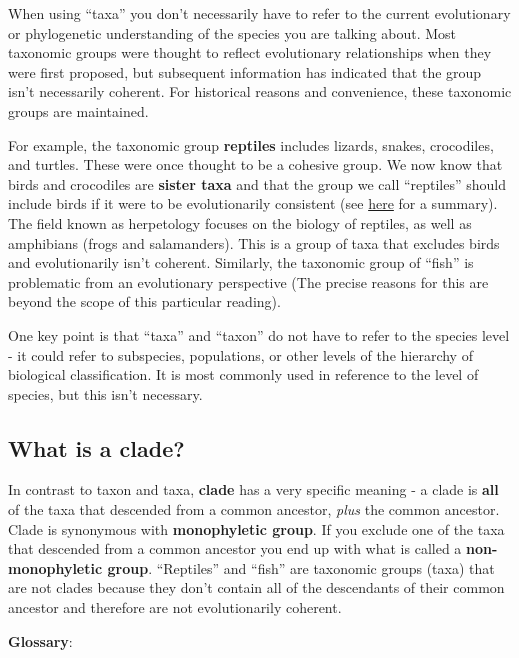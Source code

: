 \documentclass[
]{book}
\begin{document}
When using ``taxa'' you don't necessarily have to refer to the current evolutionary or phylogenetic understanding of the species you are talking about. Most taxonomic groups were thought to reflect evolutionary relationships when they were first proposed, but subsequent information has indicated that the group isn't necessarily coherent. For historical reasons and convenience, these taxonomic groups are maintained.

For example, the taxonomic group \textbf{reptiles} includes lizards, snakes, crocodiles, and turtles. These were once thought to be a cohesive group. We now know that birds and crocodiles are \textbf{sister taxa} and that the group we call ``reptiles'' should include birds if it were to be evolutionarily consistent (see \href{https://en.wikipedia.org/wiki/Reptile\#Phylogenetics_and_modern_definition}{here} for a summary). The field known as herpetology focuses on the biology of reptiles, as well as amphibians (frogs and salamanders). This is a group of taxa that excludes birds and evolutionarily isn't coherent. Similarly, the taxonomic group of ``fish'' is problematic from an evolutionary perspective (The precise reasons for this are beyond the scope of this particular reading).

One key point is that ``taxa'' and ``taxon'' do not have to refer to the species level - it could refer to subspecies, populations, or other levels of the hierarchy of biological classification. It is most commonly used in reference to the level of species, but this isn't necessary.

\hypertarget{what-is-a-clade}{%
\subsection{What is a clade?}\label{what-is-a-clade}}

In contrast to taxon and taxa, \textbf{clade} has a very specific meaning - a clade is \textbf{all} of the taxa that descended from a common ancestor, \emph{plus} the common ancestor. Clade is synonymous with \textbf{monophyletic group}. If you exclude one of the taxa that descended from a common ancestor you end up with what is called a \textbf{non-monophyletic group}. ``Reptiles'' and ``fish'' are taxonomic groups (taxa) that are not clades because they don't contain all of the descendants of their common ancestor and therefore are not evolutionarily coherent.

\textbf{Glossary}:
\end{document}
